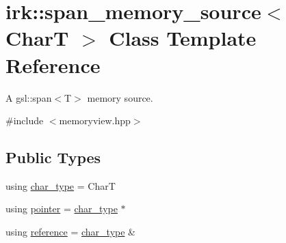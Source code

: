\hypertarget{classirk_1_1span__memory__source}{}\section{irk\+:\+:span\+\_\+memory\+\_\+source$<$ CharT $>$ Class Template Reference}
\label{classirk_1_1span__memory__source}


A gsl\+::span$<$\+T$>$ memory source.  




{\ttfamily \#include $<$memoryview.\+hpp$>$}

\subsection*{Public Types}
\begin{DoxyCompactItemize}
\item 
using \mbox{\hyperlink{classirk_1_1span__memory__source_a769d88b11f7c2882a006e93edb2cdb79}{char\+\_\+type}} = CharT
\item 
using \mbox{\hyperlink{classirk_1_1span__memory__source_a3f49fb36995410156dd5798dca6cab91}{pointer}} = \mbox{\hyperlink{classirk_1_1span__memory__source_a769d88b11f7c2882a006e93edb2cdb79}{char\+\_\+type}} $\ast$
\item 
using \mbox{\hyperlink{classirk_1_1span__memory__source_a4be24e4607769eb96ea8e6071ad1348e}{reference}} = \mbox{\hyperlink{classirk_1_1span__memory__source_a769d88b11f7c2882a006e93edb2cdb79}{char\+\_\+type}} \&
\end{DoxyCompactItemize}
